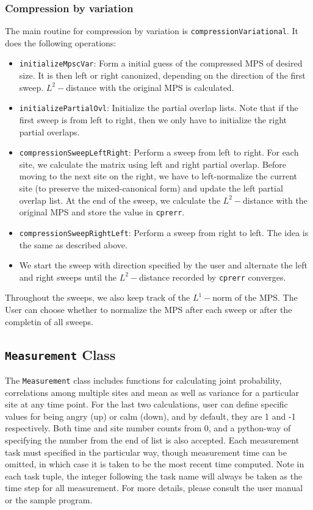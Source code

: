 \documentclass[english]{article}[12pt]
\begin{document}
\subsubsection{Compression by variation}
The main routine for compression by variation is \texttt{compressionVariational}. It does the following operations:
\begin{itemize}
\item \texttt{initializeMpscVar}: Form a initial guess of the compressed MPS of desired size. It is then left or right canonized, depending on the direction of the first sweep. $L^2-$distance with the original MPS is calculated. 
\item \texttt{initializePartialOvl}: Initialize the partial overlap lists. Note that if the first sweep is from left to right, then we only have to initialize the right partial overlaps.
\item \texttt{compressionSweepLeftRight}: Perform a sweep from left to right. For each site, we calculate the matrix using left and right partial overlap. Before moving to the next site on the right, we have to left-normalize the current site (to preserve the mixed-canonical form) and update the left partial overlap list. At the end of the sweep, we calculate the $L^2-$distance with the original MPS and store the value in \texttt{cpr\textunderscore err}.
\item \texttt{compressionSweepRightLeft}: Perform a sweep from right to left. The idea is the same as described above.
\item We start the sweep with direction specified by the user and alternate the left and right sweeps until the $L^2-$distance recorded by \texttt{cpr\textunderscore err} converges.
\end{itemize}
Throughout the sweeps, we also keep track of the $L^1-$norm of the MPS. The User can choose whether to normalize the MPS after each sweep or after the completin of all sweeps.




\subsection{\texttt{Measurement} Class}
The \texttt{Measurement} class includes functions for calculating joint probability, correlations among multiple sites and mean as well as variance for a particular site at any time point. For the last two calculations, user can define specific values for being angry (up) or calm (down), and by default, they are 1 and -1 respectively. Both time and site number counts from 0, and a python-way of specifying the number from the end of list is also accepted. Each measurement task must specified in the particular way, though measurement time can be omitted, in which case it is taken to be the most recent time computed. Note in each task tuple, the integer following the task name will always be taken as the time step for all measurement. For more details, please consult the user manual or the sample program.
\end{document}
